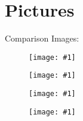 \documentclass[a4paper,10pt,fleqn]{article}
\newcommand{\filename}{FILENAME}
\newcommand\draw[1]{
	\begin{figure}[!ht]
	\centering
	\texttt{[image: \#1]}
	\end{figure}
	\newline
}
\begin{document}
 
 
\section{Pictures}

Comparison Images:
\draw{\filename-TotTime.eps}
\draw{\filename-Nodes.eps}
\draw{\filename-IniVal.eps}
\draw{\filename-ValTime.eps}
  
\end{document}
